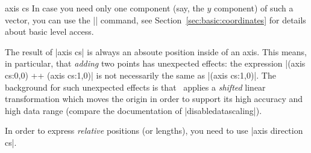 \begin{coordinatesystem}{axis cs}
In case you need only one component (say, the $y$ component) of such a vector, you can use the |\pgfplotstransformcoordinatey| command, see Section~\ref{sec:basic:coordinates} for details about basic level access.

The result of |axis cs| is always an absoute position inside of an axis. This means, in particular, that \emph{adding} two points has unexpected effects: the expression |(axis cs:0,0) ++ (axis cs:1,0)| is not necessarily the same as |(axis cs:1,0)|. The background for such unexpected effects is that \PGFPlots\ applies a \emph{shifted} linear transformation which moves the origin in order to support its high accuracy and high data range (compare the documentation of |disabledatascaling|).

In order to express \emph{relative} positions (or lengths), you need to use |axis direction cs|.
\end{coordinatesystem}

